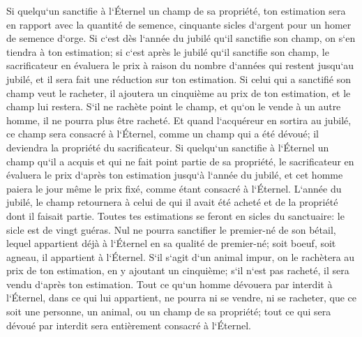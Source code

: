 \verse Si quelqu`un sanctifie à l`Éternel un champ de sa propriété, ton estimation sera en rapport avec la quantité de semence, cinquante sicles d`argent pour un homer de semence d`orge. 
\verse Si c`est dès l`année du jubilé qu`il sanctifie son champ, on s`en tiendra à ton estimation; 
\verse si c`est après le jubilé qu`il sanctifie son champ, le sacrificateur en évaluera le prix à raison du nombre d`années qui restent jusqu`au jubilé, et il sera fait une réduction sur ton estimation. 
\verse Si celui qui a sanctifié son champ veut le racheter, il ajoutera un cinquième au prix de ton estimation, et le champ lui restera. 
\verse S`il ne rachète point le champ, et qu`on le vende à un autre homme, il ne pourra plus être racheté. 
\verse Et quand l`acquéreur en sortira au jubilé, ce champ sera consacré à l`Éternel, comme un champ qui a été dévoué; il deviendra la propriété du sacrificateur. 
\verse Si quelqu`un sanctifie à l`Éternel un champ qu`il a acquis et qui ne fait point partie de sa propriété, 
\verse le sacrificateur en évaluera le prix d`après ton estimation jusqu`à l`année du jubilé, et cet homme paiera le jour même le prix fixé, comme étant consacré à l`Éternel. 
\verse L`année du jubilé, le champ retournera à celui de qui il avait été acheté et de la propriété dont il faisait partie. 
\verse Toutes tes estimations se feront en sicles du sanctuaire: le sicle est de vingt guéras. 
\verse Nul ne pourra sanctifier le premier-né de son bétail, lequel appartient déjà à l`Éternel en sa qualité de premier-né; soit boeuf, soit agneau, il appartient à l`Éternel. 
\verse S`il s`agit d`un animal impur, on le rachètera au prix de ton estimation, en y ajoutant un cinquième; s`il n`est pas racheté, il sera vendu d`après ton estimation. 
\verse Tout ce qu`un homme dévouera par interdit à l`Éternel, dans ce qui lui appartient, ne pourra ni se vendre, ni se racheter, que ce soit une personne, un animal, ou un champ de sa propriété; tout ce qui sera dévoué par interdit sera entièrement consacré à l`Éternel. 
